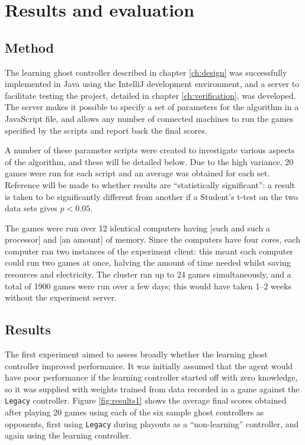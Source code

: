 \chapter{Results and evaluation}
\label{ch:results}

\section{Method}

The learning ghost controller described in chapter \ref{ch:design} was successfully implemented in Java using the IntelliJ development environment, and a server to facilitate testing the project, detailed in chapter \ref{ch:verification}, was developed.  The server makes it possible to specify a set of parameters for the algorithm in a JavaScript file, and allows any number of connected machines to run the games specified by the scripts and report back the final scores.

A number of these parameter scripts were created to investigate various aspects of the algorithm, and these will be detailed below.  Due to the high variance, 20 games were run for each script and an average was obtained for each set.  Reference will be made to whether results are ``statistically significant'': a result is taken to be significantly different from another if a Student's t-test on the two data sets gives $p < 0.05$.

The games were run over 12 identical computers having [such and such a processor] and [an amount] of memory.  Since the computers have four cores, each computer ran two instances of the experiment client: this meant each computer could run two games at once, halving the amount of time needed whilst saving resources and electricity.  The cluster ran up to 24 games simultaneously, and a total of 1900 games were run over a few days; this would have taken 1--2 weeks without the experiment server.

\section{Results}

The first experiment aimed to assess broadly whether the learning ghost controller improved performance.  It was initially assumed that the agent would have poor performance if the learning controller started off with zero knowledge, so it was supplied with weights trained from data recorded in a game against the {\tt Legacy} controller.  Figure \ref{fig:results1} shows the average final scores obtained after playing 20 games using each of the six sample ghost controllers as opponents, first using {\tt Legacy} during playouts as a ``non-learning'' controller, and again using the learning controller.

